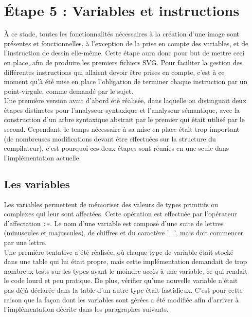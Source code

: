 \documentclass[a4paper, 12pt]{report}
\begin{document}
\chapter{\'Etape 5 : Variables et instructions}

	\`A ce stade, toutes les fonctionnalités nécessaires à la création d'une image sont présentes et fonctionnelles, à l'exception de la prise en compte des variables, et de l'instruction de dessin elle-même. Cette étape aura donc pour but de mettre ceci en place, afin de produire les premiers fichiers SVG. Pour faciliter la gestion des différentes instructions qui allaient devoir être prises en compte, c'est à ce moment qu'à été mise en place l'obligation de terminer chaque instruction par un point-virgule, comme demandé par le sujet.\\
	
	Une première version avait d'abord été réalisée, dans laquelle on distinguait deux étapes distinctes pour l'analyseur syntaxique et l'analyseur sémantique, avec la construction d'un arbre syntaxique abstrait par le premier qui était utilisé par le second. Cependant, le temps nécessaire à sa mise en place était trop important (de nombreuses modifications devant être effectuées sur la structure du compilateur), c'est pourquoi ces deux étapes sont réunies en une seule dans l'implémentation actuelle.
	
	\section{Les variables}
	
	Les variables permettent de mémoriser des valeurs de types primitifs ou complexes qui leur sont affectées. Cette opération est effectuée par l'opérateur d'affectation \texttt{:=}. Le nom d'une variable est composé d'une suite de lettres (minuscules et majuscules), de chiffres et du caractère '\_', mais doit commencer par une lettre.\\
	
	Une première tentative a été réalisée, où chaque type de variable était stocké dans une table qui lui était propre, mais cette implémentation demandait de trop nombreux tests sur les types avant le moindre accès à une variable, ce qui rendait le code lourd et peu pratique. De plus, vérifier qu'une nouvelle variable n'était pas déjà déclarée dans la table d'un autre type était fastidieux. C'est pour cette raison que la façon dont les variables sont gérées a été modifiée afin d'arriver à l'implémentation décrite dans les paragraphes suivants.\\
	
\end{document}
